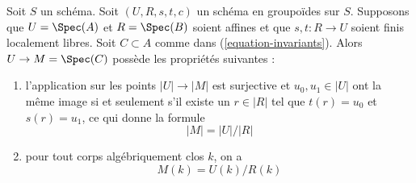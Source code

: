 \begin{lemma}
\label{lemma-points}
Soit $S$ un schéma. Soit $(U, R, s, t, c)$ un schéma en groupoïdes sur $S$.
Supposons que $U = \Spec(A)$ et $R = \Spec(B)$ soient affines et que
$s, t : R \to U$ soient finis localement libres. Soit $C \subset A$ comme dans
(\ref{equation-invariants}). Alors $U \to M = \Spec(C)$ possède
les propriétés suivantes :
\begin{enumerate}
\item l'application sur les points $|U| \to |M|$ est surjective et
$u_0, u_1 \in |U|$ ont la même image si et seulement s'il
existe un $r \in |R|$ tel que $t(r) = u_0$ et $s(r) = u_1$, ce qui donne
la formule
$$
|M| = |U|/|R|
$$
\item pour tout corps algébriquement clos $k$, on a
$$
M(k) = U(k)/R(k)
$$
\end{enumerate}
\end{lemma}

